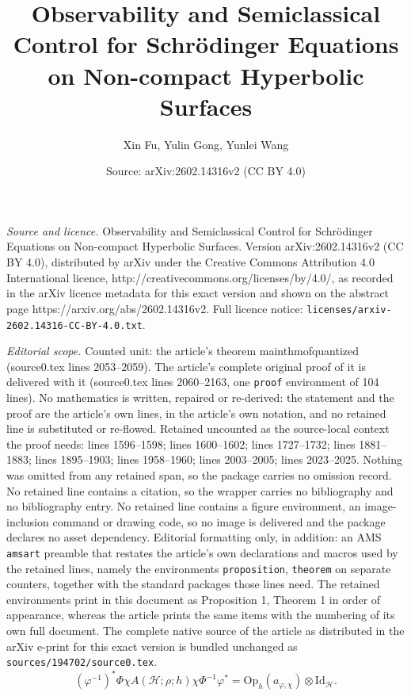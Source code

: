 \documentclass[10pt,a4paper]{amsart}
\title{Observability and Semiclassical Control for Schrödinger Equations on Non-compact Hyperbolic Surfaces}
\author{Xin Fu, Yulin Gong, Yunlei Wang}
\date{Source: arXiv:2602.14316v2 (CC BY 4.0)}
\newcommand\Oph{\ensuremath{\mathrm{Op}_h}}
\begin{document}
\maketitle

\noindent\emph{Source and licence.} Observability and Semiclassical Control for Schrödinger Equations on Non-compact Hyperbolic Surfaces. Version arXiv:2602.14316v2 (CC BY 4.0), distributed by arXiv under the Creative Commons Attribution 4.0 International licence, http://creativecommons.org/licenses/by/4.0/, as recorded in the arXiv licence metadata for this exact version and shown on the abstract page https://arxiv.org/abs/2602.14316v2. Full licence notice: \texttt{licenses/arxiv-2602.14316-CC-BY-4.0.txt}.\par\smallskip

\noindent\textit{Editorial scope.} Counted unit: the article's theorem mainthmofquantized (source0.tex lines 2053--2059). The article's complete original proof of it is delivered with it (source0.tex lines 2060--2163, one \texttt{proof} environment of 104 lines). No mathematics is written, repaired or re-derived: the statement and the proof are the article's own lines, in the article's own notation, and no retained line is substituted or re-flowed.  Retained uncounted as the source-local context the proof needs: lines 1596--1598; lines 1600--1602; lines 1727--1732; lines 1881--1883; lines 1895--1903; lines 1958--1960; lines 2003--2005; lines 2023--2025.  Nothing was omitted from any retained span, so the package carries no omission record.  No retained line contains a citation, so the wrapper carries no bibliography and no bibliography entry.  No retained line contains a figure environment, an image-inclusion command or drawing code, so no image is delivered and the package declares no asset dependency.  Editorial formatting only, in addition: an AMS \texttt{amsart} preamble that restates the article's own declarations and macros used by the retained lines, namely the environments \texttt{proposition}, \texttt{theorem} on separate counters, together with the standard packages those lines need.  The retained environments print in this document as Proposition 1, Theorem 1 in order of appearance, whereas the article prints the same items with the numbering of its own full document.  The complete native source of the article as distributed in the arXiv e-print for this exact version is bundled unchanged as \texttt{sources/194702/source0.tex}.
\begin{equation}\label{pseudooflocal}
(\varphi^{-1})^*\Phi \chi A (\mathcal{H};\rho;h) \chi \Phi^{-1} \varphi^*=\Oph(a_{\varphi,\chi})\otimes \mathrm{Id}_{\mathcal{H}}.
\end{equation}
\end{document}
